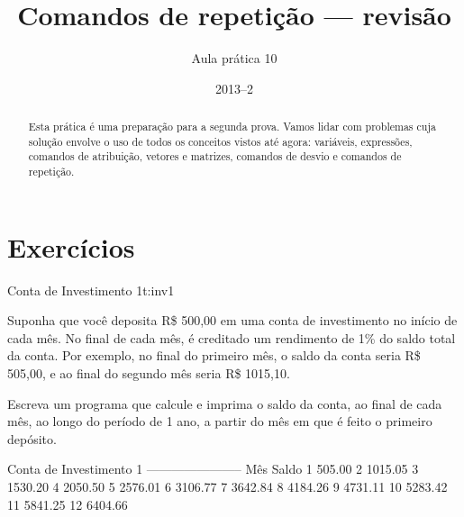 \documentclass[11pt]{practice}
\begin{document}
\subtitle{Aula prática 10}
\title{Comandos de repetição --- revisão}
\author{}
\date{2013--2}
\maketitle

\begin{abstract}
  Esta prática é uma preparação para a segunda prova. Vamos lidar com
  problemas cuja solução envolve o uso de todos os conceitos vistos até
  agora: variáveis, expressões, comandos de atribuição, vetores e
  matrizes, comandos de desvio e comandos de repetição.
\end{abstract}


\section{Exercícios}

\begin{task}[breakable]{Conta de Investimento 1}{t:inv1}

  Suponha que você deposita R\$ 500,00 em uma conta de investimento no
  início de cada mês. No final de cada mês, é creditado um rendimento de
  1\% do saldo total da conta. Por exemplo, no final do primeiro mês, o
  saldo da conta seria R\$ 505,00, e ao final do segundo mês seria R\$
  1015,10.

  Escreva um programa que calcule e imprima o saldo da conta, ao final
  de cada mês, ao longo do período de 1 ano, a partir do mês em que é
  feito o primeiro depósito.

  \begin{runexample}
Conta de Investimento 1
-----------------------
Mês     Saldo
  1    505.00
  2   1015.05
  3   1530.20
  4   2050.50
  5   2576.01
  6   3106.77
  7   3642.84
  8   4184.26
  9   4731.11
 10   5283.42
 11   5841.25
 12   6404.66
  \end{runexample}

  \tcblower
  \solution
\end{task}
\end{document}
